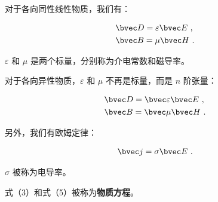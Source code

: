 对于各向同性线性物质，我们有：

\begin{equation}
\begin{aligned}
& \bvec D = \varepsilon \bvec E ~, \\
& \bvec B = \mu \bvec H ~.
\end{aligned}
\end{equation}

$\varepsilon$ 和 $\mu$ 是两个标量，分别称为介电常数和磁导率。

对于各向异性物质，$\varepsilon$ 和 $\mu$ 不再是标量，而是 $n$ 阶张量：

\begin{equation}
\begin{aligned}
& \bvec D = \bvec \varepsilon \bvec E ~, \\
& \bvec B = \bvec \mu \bvec H ~.
\end{aligned}
\end{equation}

另外，我们有欧姆定律：

\begin{equation}
\begin{aligned}
\bvec j = \sigma \bvec E ~.
\end{aligned}
\end{equation}

$\sigma$ 被称为电导率。

式（3）和式（5）被称为\textbf{物质方程}。
